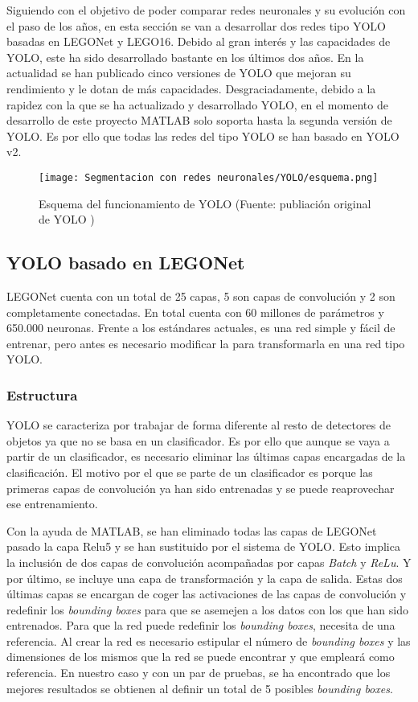 Siguiendo con el objetivo de poder comparar redes neuronales y su evolución con el paso de los años, en esta sección se van a desarrollar dos redes tipo YOLO basadas en LEGONet y LEGO16. Debido al gran interés y las capacidades de YOLO, este ha sido desarrollado bastante en los últimos dos años. En la actualidad se han publicado cinco versiones de YOLO que mejoran su rendimiento y le dotan de más capacidades. Desgraciadamente, debido a la rapidez con la que se ha actualizado y desarrollado YOLO, en el momento de desarrollo de este proyecto MATLAB solo soporta hasta la segunda versión de YOLO. Es por ello que todas las redes del tipo YOLO se han basado en YOLO v2.

\begin{figure}[ht]  %
	\centering
	\texttt{[image: Segmentacion con redes neuronales/YOLO/esquema.png]}
	\caption[Esquema del funcionamiento de YOLO]{Esquema del funcionamiento de YOLO (Fuente: publiación original de YOLO \citep{YOLO})}
	\label{fig:YOLO esquema}
\end{figure}

\newpage
\subsection{YOLO basado en LEGONet}
LEGONet cuenta con un total de 25 capas, 5 son capas de convolución y 2 son completamente conectadas. En total cuenta con 60 millones de parámetros y 650.000 neuronas. Frente a los estándares actuales, es una red simple y fácil de entrenar, pero antes es necesario modificar la para transformarla en una red tipo YOLO.

\subsubsection*{Estructura}
YOLO se caracteriza por trabajar de forma diferente al resto de detectores de objetos ya que no se basa en un clasificador. Es por ello que aunque se vaya a partir de un clasificador, es necesario eliminar las últimas capas encargadas de la clasificación. El motivo por el que se parte de un clasificador es porque las primeras capas de convolución ya han sido entrenadas y se puede reaprovechar ese entrenamiento.

Con la ayuda de MATLAB, se han eliminado todas las capas de LEGONet pasado la capa Relu5 y se han sustituido por el sistema de YOLO. Esto implica la inclusión de dos capas de convolución acompañadas por capas \textit{Batch} y \textit{ReLu}. Y por último, se incluye una capa de transformación y la capa de salida. Estas dos últimas capas se encargan de coger las activaciones de las capas de convolución y redefinir los \textit{bounding boxes} para que se asemejen a los datos con los que han sido entrenados. Para que la red puede redefinir los \textit{bounding boxes}, necesita de una referencia. Al crear la red es necesario estipular el número de \textit{bounding boxes} y las dimensiones de los mismos que la red se puede encontrar y que empleará como referencia. En nuestro caso y con un par de pruebas, se ha encontrado que los mejores resultados se obtienen al definir un total de 5 posibles \textit{bounding boxes}.

